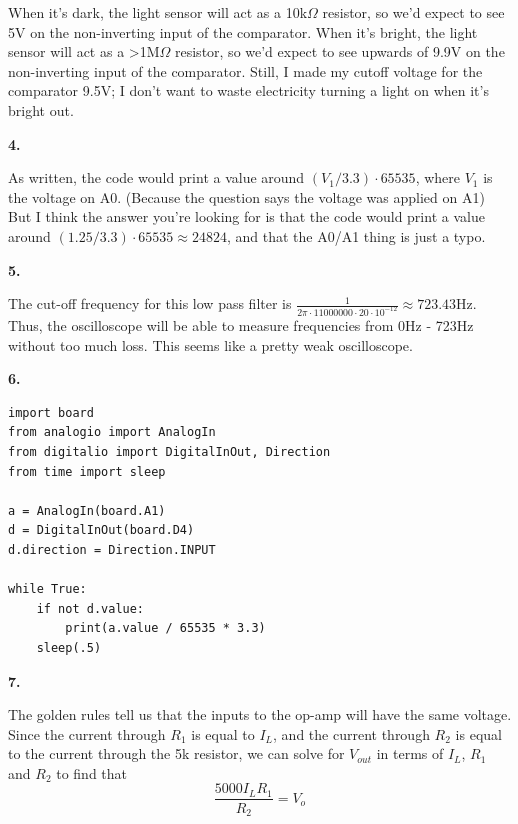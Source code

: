 \documentclass{article}
\begin{document}
    When it's dark, the light sensor will act as a 10k$\Omega$ resistor, so we'd expect to see 5V on the non-inverting input of the comparator.
    When it's bright, the light sensor will act as a >1M$\Omega$ resistor, so we'd expect to see upwards of 9.9V on the non-inverting input of the comparator.
    Still, I made my cutoff voltage for the comparator 9.5V; I don't want to waste electricity turning a light on when it's bright out.

\newpage\noindent\textbf{4.}

    As written, the code would print a value around $(V_1/3.3) \cdot 65535$, where $V_1$ is the voltage on A0. (Because the question says the voltage was applied on A1)
    But I think the answer you're looking for is that the code would print a value around $(1.25/3.3) \cdot 65535 \approx 24824$, and that the A0/A1 thing is just a typo.

\medskip\noindent\textbf{5.}

    The cut-off frequency for this low pass filter is $\frac{1}{2\pi\cdot11000000\cdot 20 \cdot 10^{-12}} \approx 723.43$Hz.
    Thus, the oscilloscope will be able to measure frequencies from 0Hz - 723Hz without too much loss.
    This seems like a pretty weak oscilloscope.

\medskip\noindent\textbf{6.}
\begin{verbatim}
import board
from analogio import AnalogIn
from digitalio import DigitalInOut, Direction
from time import sleep

a = AnalogIn(board.A1)
d = DigitalInOut(board.D4)
d.direction = Direction.INPUT

while True:
    if not d.value:
        print(a.value / 65535 * 3.3)
    sleep(.5)
\end{verbatim}

\newpage\noindent\textbf{7.}

    The golden rules tell us that the inputs to the op-amp will have the same voltage.
    Since the current through $R_1$ is equal to $I_L$, and the current through $R_2$ is equal to the current through the 5k resistor, we can solve for $V_{out}$ in terms of $I_L$, $R_1$ and $R_2$ to find that $$\frac{5000I_LR_1}{R_2} = V_o$$
\end{document}
